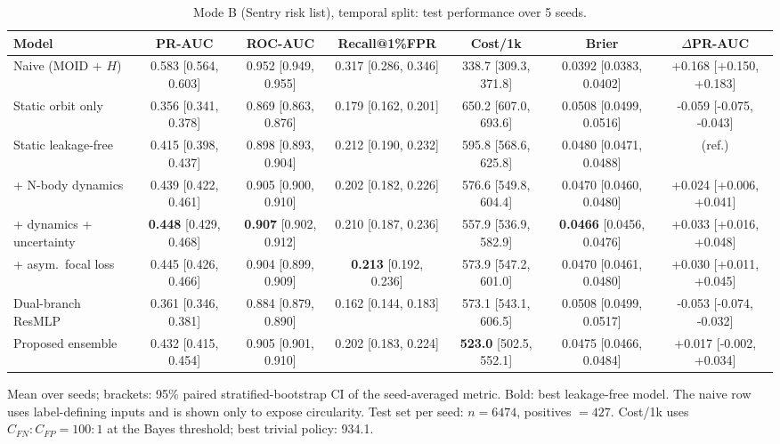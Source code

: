 \begin{table}[t]
\centering
\small
\caption{Mode B (Sentry risk list), temporal split: test performance over 5 seeds.}
\label{tab:sentry_temporal_all}
\begin{tabular}{lcccccc}
\toprule
Model & PR-AUC & ROC-AUC & Recall@1\%FPR & Cost/1k & Brier & $\Delta$PR-AUC \\
\midrule
Naive (MOID + $H$) & 0.583 \scriptsize{[0.564, 0.603]} & 0.952 \scriptsize{[0.949, 0.955]} & 0.317 \scriptsize{[0.286, 0.346]} & 338.7 \scriptsize{[309.3, 371.8]} & 0.0392 \scriptsize{[0.0383, 0.0402]} & +0.168 \scriptsize{[+0.150, +0.183]} \\
\midrule
Static orbit only & 0.356 \scriptsize{[0.341, 0.378]} & 0.869 \scriptsize{[0.863, 0.876]} & 0.179 \scriptsize{[0.162, 0.201]} & 650.2 \scriptsize{[607.0, 693.6]} & 0.0508 \scriptsize{[0.0499, 0.0516]} & -0.059 \scriptsize{[-0.075, -0.043]} \\
Static leakage-free & 0.415 \scriptsize{[0.398, 0.437]} & 0.898 \scriptsize{[0.893, 0.904]} & 0.212 \scriptsize{[0.190, 0.232]} & 595.8 \scriptsize{[568.6, 625.8]} & 0.0480 \scriptsize{[0.0471, 0.0488]} & (ref.) \\
+ N-body dynamics & 0.439 \scriptsize{[0.422, 0.461]} & 0.905 \scriptsize{[0.900, 0.910]} & 0.202 \scriptsize{[0.182, 0.226]} & 576.6 \scriptsize{[549.8, 604.4]} & 0.0470 \scriptsize{[0.0460, 0.0480]} & +0.024 \scriptsize{[+0.006, +0.041]} \\
+ dynamics + uncertainty & \textbf{0.448} \scriptsize{[0.429, 0.468]} & \textbf{0.907} \scriptsize{[0.902, 0.912]} & 0.210 \scriptsize{[0.187, 0.236]} & 557.9 \scriptsize{[536.9, 582.9]} & \textbf{0.0466} \scriptsize{[0.0456, 0.0476]} & +0.033 \scriptsize{[+0.016, +0.048]} \\
+ asym.\ focal loss & 0.445 \scriptsize{[0.426, 0.466]} & 0.904 \scriptsize{[0.899, 0.909]} & \textbf{0.213} \scriptsize{[0.192, 0.236]} & 573.9 \scriptsize{[547.2, 601.0]} & 0.0470 \scriptsize{[0.0461, 0.0480]} & +0.030 \scriptsize{[+0.011, +0.045]} \\
Dual-branch ResMLP & 0.361 \scriptsize{[0.346, 0.381]} & 0.884 \scriptsize{[0.879, 0.890]} & 0.162 \scriptsize{[0.144, 0.183]} & 573.1 \scriptsize{[543.1, 606.5]} & 0.0508 \scriptsize{[0.0499, 0.0517]} & -0.053 \scriptsize{[-0.074, -0.032]} \\
Proposed ensemble & 0.432 \scriptsize{[0.415, 0.454]} & 0.905 \scriptsize{[0.901, 0.910]} & 0.202 \scriptsize{[0.183, 0.224]} & \textbf{523.0} \scriptsize{[502.5, 552.1]} & 0.0475 \scriptsize{[0.0466, 0.0484]} & +0.017 \scriptsize{[-0.002, +0.034]} \\
\bottomrule
\end{tabular}
\par\vspace{2pt}\footnotesize Mean over seeds; brackets: 95\% paired stratified-bootstrap CI of the seed-averaged metric. Bold: best leakage-free model. The naive row uses label-defining inputs and is shown only to expose circularity. Test set per seed: $n=6474$, positives $=427$. Cost/1k uses $C_{FN}{:}C_{FP}=100{:}1$ at the Bayes threshold; best trivial policy: 934.1.
\end{table}
